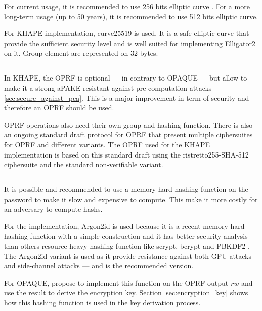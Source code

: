 \documentclass[../report.tex]{subfiles}
\begin{document}
For current usage, it is recommended to use 256 bits elliptic curve \cite{ECRYPT_Keylength}. For a more long-term usage (up to 50 years), it is recommended to use 512 bits elliptic curve.


For KHAPE implementation, curve25519 is used. It is a safe elliptic curve that provide the sufficient security level and is well suited for implementing Elligator2 on it.
Group element are represented on 32 bytes.




\subsection{} \label{sec:design_choice_oprf}
In KHAPE, the OPRF is optional --- in contrary to OPAQUE --- but allow to make it a strong aPAKE resistant against pre-computation attacks \ref{sec:secure_against_pca}.
This is a major improvement in term of security and therefore an OPRF should be used.

OPRF operations also need their own group and hashing function.
There is also an ongoing standard draft protocol for OPRF \cite{VOPRF_Standard_Draft} that present multiple ciphersuites for OPRF and different variants.
The OPRF used for the KHAPE implementation is based on this standard draft using the ristretto255-SHA-512 ciphersuite and the standard non-verifiable variant. %





\subsection{} \label{sec:design_choice_slowhash}
It is possible and recommended to use a memory-hard hashing function on the password to make it slow and expensive to compute. 
This make it more costly for an adversary to compute hashs.

For the implementation, Argon2id \cite{Argon2_Paper} is used because it is a recent memory-hard hashing function with a simple construction and it has better security analysis than others resource-heavy hashing function like scrypt, bcrypt and PBKDF2 \cite{CAA}. The Argon2id variant is used as it provide resistance against both GPU attacks and side-channel attacks --- and is the recommended version.

For OPAQUE, \cite{OPAQUE_Standard_Draft} propose to implement this function on the OPRF output $rw$ and use the result to derive the encryption key. Section \ref{sec:encryption_key} shows how this hashing function is used in the key derivation process.
\end{document}
